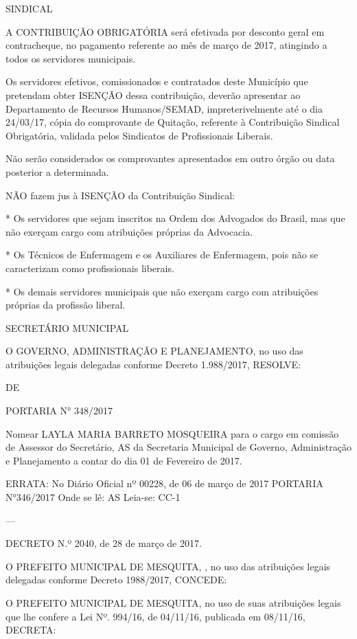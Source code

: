 \documentclass{doliberto}
\begin{document}
SINDICAL 

A CONTRIBUIÇÃO 
OBRIGATÓRIA será 
efetivada  por  desconto  geral  em  contracheque,  no 
pagamento referente ao mês de março de 2017, atingindo a 
todos os servidores municipais. 

Os  servidores  efetivos,  comissionados  e  contratados  deste 
Município  que  pretendam  obter 
ISENÇÃO  dessa 
contribuição,  deverão  apresentar  ao  Departamento  de 
Recursos  Humanos/SEMAD,  impreterivelmente  até  o  dia 
24/03/17,  cópia  do  comprovante  de  Quitação,  referente  à 
Contribuição Sindical Obrigatória, validada pelos Sindicatos 
de Profissionais Liberais. 

Não serão considerados os comprovantes apresentados em 
outro órgão ou data posterior a determinada. 

NÃO fazem jus à ISENÇÃO da Contribuição Sindical: 

*  Os  servidores  que  sejam  inscritos  na  Ordem  dos 
Advogados  do  Brasil,  mas  que  não  exerçam  cargo  com 
atribuições próprias da Advocacia. 

*  Os  Técnicos  de  Enfermagem  e  os  Auxiliares  de 
Enfermagem,  pois  não  se  caracterizam  como  profissionais 
liberais. 

* Os demais servidores municipais que não exerçam cargo 
com atribuições próprias da profissão liberal. 

SECRETÁRIO  MUNICIPAL 

O 
GOVERNO, 
ADMINISTRAÇÃO  E  PLANEJAMENTO,  no  uso  das 
atribuições legais delegadas conforme Decreto 1.988/2017, 
RESOLVE: 

DE 

PORTARIA N° 348/2017 

Nomear  LAYLA  MARIA  BARRETO  MOSQUEIRA  para  o 
cargo  em  comissão  de  Assessor  do  Secretário,  AS  da 
Secretaria  Municipal  de  Governo,  Administração  e 
Planejamento a contar do dia 01 de Fevereiro de 2017. 

 
ERRATA: 
No Diário Oficial nº 00228, de 06 de março de 2017 
PORTARIA N°346/2017 
Onde se lê: 
AS 
Leia-se:  
CC-1 

---

DECRETO N.º 2040, de 28 de março de 2017. 

O  PREFEITO  MUNICIPAL  DE  MESQUITA,  ,  no  uso  das 
atribuições legais delegadas conforme Decreto 1988/2017, 
CONCEDE:  

O  PREFEITO  MUNICIPAL  DE  MESQUITA,  no  uso  de  suas 
atribuições  legais  que  lhe  confere  a  Lei  Nº.  994/16,  de 
04/11/16, publicada em 08/11/16, DECRETA: 
\end{document}
